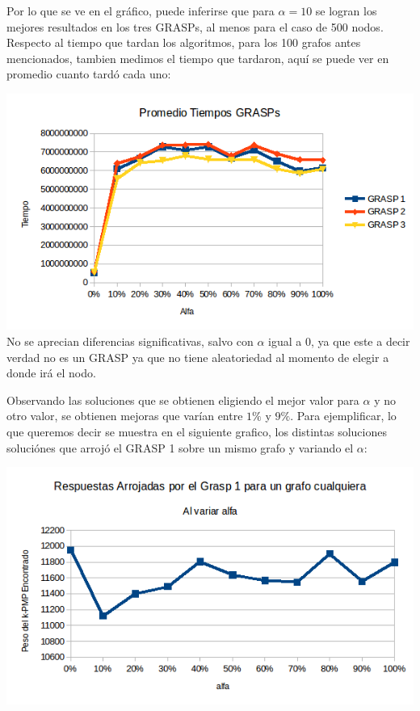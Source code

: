 Por lo que se ve en el gráfico, puede inferirse que para $\alpha=10$ se logran los mejores resultados en los tres GRASPs, al menos para el caso de 500 nodos. Respecto al tiempo que tardan los algoritmos, para los 100 grafos antes mencionados, tambien medimos el tiempo que tardaron, aquí se puede ver en promedio cuanto tardó cada uno:

\includegraphics[scale=0.7]{Ej5/tiemposAlfa.png}\\

No se aprecian diferencias significativas, salvo con $\alpha$ igual a 0, ya que este a decir verdad no es un GRASP ya que no tiene aleatoriedad al momento de elegir a donde irá el nodo.

Observando las soluciones que se obtienen eligiendo el mejor valor para $\alpha$ y no otro valor, se obtienen mejoras que varían entre $1\%$ y $9\%$. Para ejemplificar, lo que queremos decir se muestra en el siguiente grafico, los distintas soluciones soluciónes que arrojó el GRASP 1 sobre un mismo grafo y variando el $\alpha$:

\includegraphics[scale=0.7]{Ej5/ejemploAlfa1.png}\\


